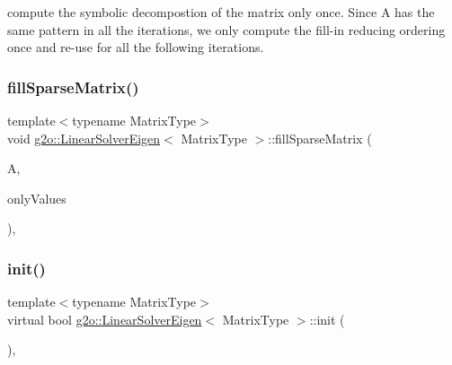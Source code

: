compute the symbolic decompostion of the matrix only once. Since A has the same pattern in all the iterations, we only compute the fill-\/in reducing ordering once and re-\/use for all the following iterations. \mbox{\label{classg2o_1_1_linear_solver_eigen_a8ab862dc1eebb6ec5815f3970e9073f3}} 
\subsubsection{\texorpdfstring{fill\+Sparse\+Matrix()}{fillSparseMatrix()}}
{\footnotesize\ttfamily template$<$typename Matrix\+Type$>$ \\
void \mbox{\hyperlink{classg2o_1_1_linear_solver_eigen}{g2o\+::\+Linear\+Solver\+Eigen}}$<$ Matrix\+Type $>$\+::fill\+Sparse\+Matrix (\begin{DoxyParamCaption}\item[{const \mbox{\hyperlink{classg2o_1_1_sparse_block_matrix}{Sparse\+Block\+Matrix}}$<$ Matrix\+Type $>$ \&}]{A,  }\item[{bool}]{only\+Values }\end{DoxyParamCaption})\hspace{0.3cm}{\ttfamily [inline]}, {\ttfamily [protected]}}

\mbox{\label{classg2o_1_1_linear_solver_eigen_a8fca4bb987dcbeb94a366b1532dee139}} 
\subsubsection{\texorpdfstring{init()}{init()}}
{\footnotesize\ttfamily template$<$typename Matrix\+Type$>$ \\
virtual bool \mbox{\hyperlink{classg2o_1_1_linear_solver_eigen}{g2o\+::\+Linear\+Solver\+Eigen}}$<$ Matrix\+Type $>$\+::init (\begin{DoxyParamCaption}{ }\end{DoxyParamCaption})\hspace{0.3cm}{\ttfamily [inline]}, {\ttfamily [virtual]}}

